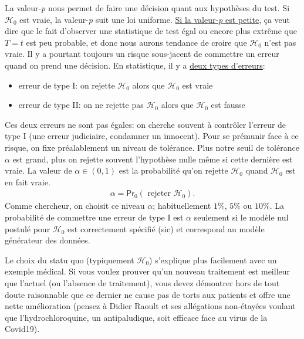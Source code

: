 \documentclass[
  11pt,
  letterpaper,
]{scrbook}
\providecommand{\tightlist}{%
  \setlength{\itemsep}{0pt}\setlength{\parskip}{0pt}}\usepackage{longtable,booktabs,array}
\theoremstyle{definition}
\theoremstyle{definition}
\theoremstyle{remark}
\begin{document}
La valeur-\emph{p} nous permet de faire une décision quant aux
hypothèses du test. Si \(\mathscr{H}_0\) est vraie, la valeur-\emph{p}
suit une loi uniforme. \href{https://xkcd.com/1478/}{Si la
valeur-\emph{p} est petite}, ça veut dire que le fait d'observer une
statistique de test égal ou encore plus extrême que \(T=t\) est peu
probable, et donc nous aurons tendance de croire que \(\mathscr{H}_0\)
n'est pas vraie. Il y a pourtant toujours un risque sous-jacent de
commettre un erreur quand on prend une décision. En statistique, il y a
\href{https://xkcd.com/2303/}{deux types d'erreurs}:

\begin{itemize}
\tightlist
\item
  erreur de type I: on rejette \(\mathscr{H}_0\) alors que
  \(\mathscr{H}_0\) est vraie
\item
  erreur de type II: on ne rejette pas \(\mathscr{H}_0\) alors que
  \(\mathscr{H}_0\) est fausse
\end{itemize}

Ces deux erreurs ne sont pas égales: on cherche souvent à contrôler
l'erreur de type I (une erreur judiciaire, condamner un innocent). Pour
se prémunir face à ce risque, on fixe préalablement un niveau de
tolérance. Plus notre seuil de tolérance \(\alpha\) est grand, plus on
rejette souvent l'hypothèse nulle même si cette dernière est vraie. La
valeur de \(\alpha \in (0, 1)\) est la probabilité qu'on rejette
\(\mathscr{H}_0\) quand \(\mathscr{H}_0\) est en fait vraie.
\begin{align*}
\alpha = \mathsf{Pr}_0\left(\text{ rejeter } \mathscr{H}_0\right).
\end{align*} Comme chercheur, on choisit ce niveau \(\alpha\);
habituellement \(1\)\%, \(5\)\% ou \(10\)\%. La probabilité de commettre
une erreur de type I est \(\alpha\) seulement si le modèle nul postulé
pour \(\mathscr{H}_0\) est correctement spécifié (sic) et correspond au
modèle générateur des données.

Le choix du statu quo (typiquement \(\mathscr{H}_0\)) s'explique plus
facilement avec un exemple médical. Si vous voulez prouver qu'un nouveau
traitement est meilleur que l'actuel (ou l'absence de traitement), vous
devez démontrer hors de tout doute raisonnable que ce dernier ne cause
pas de torts aux patients et offre une nette amélioration (pensez à
Didier Raoult et ses allégations non-étayées voulant que
l'hydrochloroquine, un antipaludique, soit efficace face au virus de la
Covid19).
\end{document}
